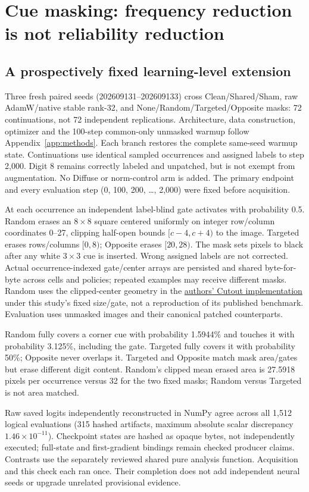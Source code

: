 \documentclass[10pt]{article}
\begin{document}
\section{Cue masking: frequency reduction is not reliability reduction}\label{app:augmentation}
\subsection{A prospectively fixed learning-level extension}
Three fresh paired seeds (202609131--202609133) cross Clean/Shared/Sham, raw AdamW/native stable rank-32, and None/Random/Targeted/Opposite masks: 72 continuations, not 72 independent replications. Architecture, data construction, optimizer and the 100-step common-only unmasked warmup follow Appendix~\ref{app:methods}. Each branch restores the complete same-seed warmup state. Continuations use identical sampled occurrences and assigned labels to step 2,000. Digit 8 remains correctly labeled and unpatched, but is not exempt from augmentation. No Diffuse or norm-control arm is added. The primary endpoint and every evaluation step (0, 100, 200, \ldots, 2,000) were fixed before acquisition.

At each occurrence an independent label-blind gate activates with probability 0.5. Random erases an $8\times8$ square centered uniformly on integer row/column coordinates 0--27, clipping half-open bounds $[c-4,c+4)$ to the image. Targeted erases rows/columns $[0,8)$; Opposite erases $[20,28)$. The mask sets pixels to black after any white $3\times3$ cue is inserted. Wrong assigned labels are not corrected. Actual occurrence-indexed gate/center arrays are persisted and shared byte-for-byte across cells and policies; repeated examples may receive different masks. Random uses the clipped-center geometry in the \href{https://github.com/uoguelph-mlrg/Cutout/blob/master/util/cutout.py}{authors' Cutout implementation} under this study's fixed size/gate, not a reproduction of its published benchmark. Evaluation uses unmasked images and their canonical patched counterparts.

Random fully covers a corner cue with probability 1.5944\% and touches it with probability 3.125\%, including the gate. Targeted fully covers it with probability 50\%; Opposite never overlaps it. Targeted and Opposite match mask area/gates but erase different digit content. Random's clipped mean erased area is 27.5918 pixels per occurrence versus 32 for the two fixed masks; Random versus Targeted is not area matched.

Raw saved logits independently reconstructed in NumPy agree across all 1,512 logical evaluations (315 hashed artifacts, maximum absolute scalar discrepancy $1.46\times10^{-11}$). Checkpoint states are hashed as opaque bytes, not independently executed; full-state and first-gradient bindings remain checked producer claims. Contrasts use the separately reviewed shared pure analysis function. Acquisition and this check each ran once. Their completion does not add independent neural seeds or upgrade unrelated provisional evidence.
\end{document}
